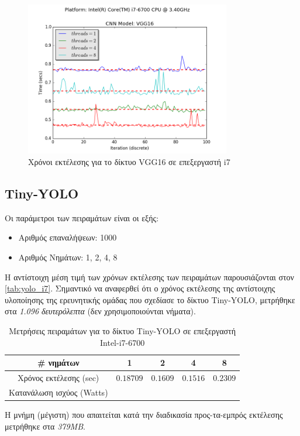 \begin{figure}[H]
  \centering
  \includegraphics[width=0.8\textwidth]{./images/chapter6/benchmark_vgg16_i7.png}
  \caption[Χρόνoι εκτέλεσης για το δίκτυο VGG16 σε επεξεργαστή i7]{Χρόνοι εκτέλεσης για το δίκτυο VGG16 σε επεξεργαστή i7}
  \label{fig:vgg16_results_i7}
\end{figure}




\subsection{Tiny-YOLO}

Οι παράμετροι των πειραμάτων είναι οι εξής:
\begin{itemize}
  \item{Αριθμός επαναλήψεων: 1000}
  \item{Αριθμός Νημάτων: 1, 2, 4, 8}
\end{itemize}

Η αντίστοιχη μέση τιμή των χρόνων εκτέλεσης των πειραμάτων παρουσιάζονται στον \autoref{tab:yolo_i7}.
Σημαντικό να αναφερθεί ότι ο χρόνος εκτέλεσης της αντίστοιχης υλοποίησης της ερευνητικής ομάδας
που σχεδίασε το δίκτυο Tiny-YOLO, μετρήθηκε στα \emph{1.096 δευτερόλεπτα} (δεν χρησιμοποιούνται νήματα).

\begin{table}[H]
  \begin{center}
    \caption{Μετρήσεις πειραμάτων για το δίκτυο Tiny-YOLO σε επεξεργαστή Intel-i7-6700}
    \label{tab:yolo_i7}
    \begin{tabular}{ | c | c | c | c | c | }
      \hline
      \rowcolor{Gray}
      \# νημάτων & 1 & 2 & 4 & 8 \\
      \hline
      Χρόνος εκτέλεσης (sec) & $0.18709$ & $0.1609$ & $0.1516$ & $0.2309$ \\
      Κατανάλωση ισχύος (Watts) & $ $ & $ $ & $ $ & $ $ \\
      \hline
    \end{tabular}
  \end{center}
\end{table}
Η μνήμη (μέγιστη) που απαιτείται κατά την διαδικασία
προς-τα-εμπρός εκτέλεσης μετρήθηκε στα \emph{379MB}.

